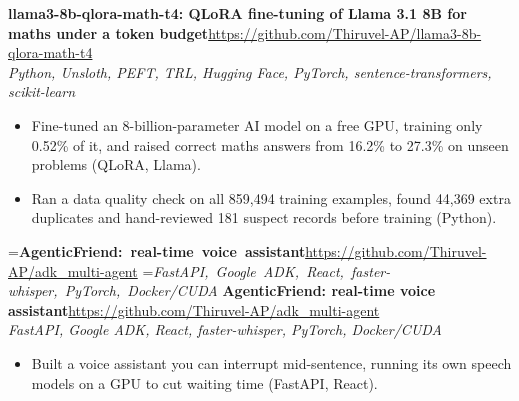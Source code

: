 \documentclass[a4paper,11pt]{article}
\newcommand{\project}[3]{%
  \textbf{#1}\hfill#3\\ {\color{muted}\small\textit{#2}}\par}
\newcommand{\gap}{\vspace{5pt}}
\begin{document}
\ifdim\wd0>\linewidth
\ifdim\wd2>\linewidth
\textbf{llama3-8b-qlora-math-t4: QLoRA fine-tuning of Llama 3.1 8B for maths under a token budget}\\ {\color{muted}\small\textit{Python, Unsloth, PEFT, TRL, Hugging Face, PyTorch, sentence-transformers, scikit-learn}}\\ \hspace*{\fill}{\small\url{https://github.com/Thiruvel-AP/llama3-8b-qlora-math-t4}}\par
\else
\textbf{llama3-8b-qlora-math-t4: QLoRA fine-tuning of Llama 3.1 8B for maths under a token budget}\\ {\color{muted}\small\textit{Python, Unsloth, PEFT, TRL, Hugging Face, PyTorch, sentence-transformers, scikit-learn}}\hfill{\small\url{https://github.com/Thiruvel-AP/llama3-8b-qlora-math-t4}}\par
\fi
\else
\project{llama3-8b-qlora-math-t4: QLoRA fine-tuning of Llama 3.1 8B for maths under a token budget}{Python, Unsloth, PEFT, TRL, Hugging Face, PyTorch, sentence-transformers, scikit-learn}{\url{https://github.com/Thiruvel-AP/llama3-8b-qlora-math-t4}}
\fi
\begin{itemize}
  \item Fine-tuned an 8-billion-parameter AI model on a free GPU, training only 0.52\% of it, and raised correct maths answers from 16.2\% to 27.3\% on unseen problems (QLoRA, Llama).
  \item Ran a data quality check on all 859,494 training examples, found 44,369 extra duplicates and hand-reviewed 181 suspect records before training (Python).
\end{itemize}
\gap
{}
=\hbox{\textbf{AgenticFriend: real-time voice assistant}\hspace{1em}\url{https://github.com/Thiruvel-AP/adk_multi-agent}}%
=\hbox{{\small\textit{FastAPI, Google ADK, React, faster-whisper, PyTorch, Docker/CUDA}}}%
\ifdim\wd0>\linewidth
\ifdim\wd2>\linewidth
\textbf{AgenticFriend: real-time voice assistant}\\ {\color{muted}\small\textit{FastAPI, Google ADK, React, faster-whisper, PyTorch, Docker/CUDA}}\\ \hspace*{\fill}{\small\url{https://github.com/Thiruvel-AP/adk_multi-agent}}\par
\else
\textbf{AgenticFriend: real-time voice assistant}\\ {\color{muted}\small\textit{FastAPI, Google ADK, React, faster-whisper, PyTorch, Docker/CUDA}}\hfill{\small\url{https://github.com/Thiruvel-AP/adk_multi-agent}}\par
\fi
\else
\project{AgenticFriend: real-time voice assistant}{FastAPI, Google ADK, React, faster-whisper, PyTorch, Docker/CUDA}{\url{https://github.com/Thiruvel-AP/adk_multi-agent}}
\fi
\begin{itemize}
  \item Built a voice assistant you can interrupt mid-sentence, running its own speech models on a GPU to cut waiting time (FastAPI, React).
\end{itemize}
\end{document}
